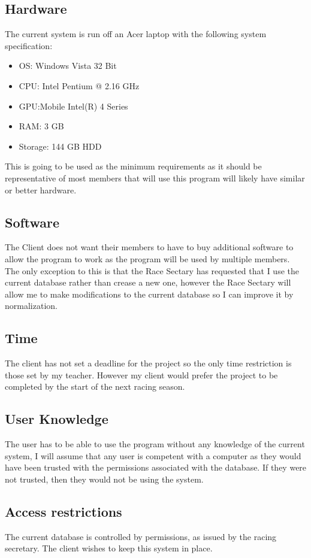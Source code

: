\subsection{Hardware}
The current system is run off an Acer laptop with the following system specification:

\begin{itemize}
\item OS: Windows Vista 32 Bit
\item CPU: Intel Pentium @ 2.16 GHz
\item GPU:Mobile Intel(R) 4 Series 
\item RAM: 3 GB
\item Storage: 144 GB HDD
\end{itemize}

This is going to be used as the minimum requirements as it should be representative of most members that will use this program will likely have similar or better hardware.
\subsection{Software}
The Client does not want their members to have to buy additional software to allow the program to work as the program will be used by multiple members. The only exception to this is that the Race Sectary has requested that I use the current database rather than crease a new one, however the Race Sectary will allow me to make modifications to the current database so I can improve it by normalization.
\subsection{Time}
The client has not set a deadline for the project so the only time restriction is those set by my teacher. However my client would prefer the project to be completed by the start of the next racing season.
\subsection{User Knowledge}
The user has to be able to use the program without any knowledge of the current system, I will assume that any user is competent with a computer as they would have been trusted with the permissions associated with the database. If they were not trusted, then they would not be using the system.
\subsection{Access restrictions}
The current database is controlled by permissions, as issued by the racing secretary. The client wishes to keep this system in place.
